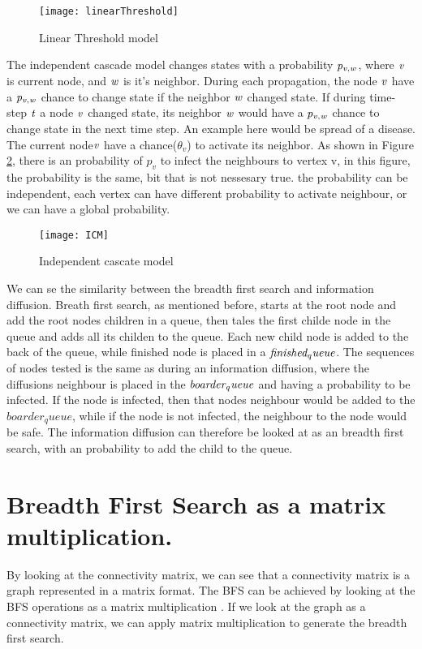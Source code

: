 \begin{figure}[!ht]
	\texttt{[image: linearThreshold]}
	\caption{Linear Threshold model} 
	\label{fig:linearThresh}
\end{figure}

The independent cascade model changes states with a probability $\it{p_{v, w}}$, where $\it{ v }$ is current node, and $\it{w}$ is it's neighbor. During each propagation, the node $\it{v}$ have a  $\it{p_{v, w}}$ chance to change state if the neighbor $\it{w}$ changed state. If during time-step $\it{t}$ a node $\it{v}$ changed state, its neighbor $\it{w}$ would have a $\it{p_{v, w}}$ chance to change state in the next time step. An example here would be spread of a disease. The current node$\it{v}$ have a chance($\theta_v$) to activate its neighbor. As shown in Figure \ref{fig:ICM}, there is an probability of $p_v$ to infect the neighbours to vertex v, in this figure, the probability is the same, bit that is not nessesary true. the probability can be independent, each vertex can have different probability to activate neighbour, or we can have a global probability.

\begin{figure}[!ht]
	\texttt{[image: ICM]}
	\caption{Independent cascate model} 
	\label{fig:ICM}
\end{figure}

We can se the similarity between the breadth first search and information diffusion. Breath first search, as mentioned before, starts at the root node and add the root nodes children in a queue, then tales the first childe node in the queue and adds all its childen to the queue. Each new child node is added to the back of the queue, while finished node is placed in a $\it{finished_queue}$. The sequences of nodes tested is the same as during an information diffusion, where the diffusions neighbour is placed in the $ \it{boarder_queue} $ and having a probability to be infected. If the node is infected, then that nodes neighbour would be added to the $boarder_queue$, while if the node is not infected, the neighbour to the node would be safe. The information diffusion can therefore be looked at as an breadth first search, with an probability to add the child to the queue. 

\section{Breadth First Search as a matrix multiplication.}
By looking at the connectivity matrix, we can see that a connectivity matrix is a graph represented in a matrix format. The BFS can be achieved by looking at the BFS operations as a matrix multiplication \cite{algoToMath}. If we look at the graph as a connectivity matrix, we can apply matrix multiplication to generate the breadth first search. 

